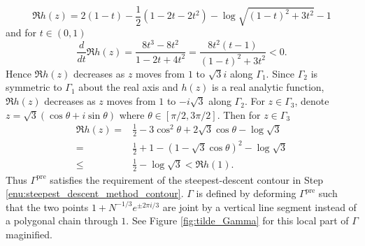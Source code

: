 \documentclass[11pt, a4paper]{article}
\numberwithin{equation}{section}
\DeclareMathOperator{\pre}{pre}
\theoremstyle{definition}
\theoremstyle{remark}
\begin{document}
\begin{equation}
  \Re h(z) = 2(1 - t) - \frac{1}{2}(1 - 2t - 2t^2) - \log \sqrt{(1 - t)^2 + 3t^2} - 1
\end{equation}
and for $t \in (0, 1)$
\begin{equation}
  \frac{d}{dt} \Re h(z) = \frac{8t^3 - 8t^2}{1 - 2t + 4t^2} = \frac{8t^2 (t - 1)}{(1 - t)^2 + 3t^2} < 0.
\end{equation}
Hence $\Re h(z)$ decreases as $z$ moves from $1$ to $\sqrt{3}i$ along $\Gamma_1$. Since $\Gamma_2$ is symmetric to $\Gamma_1$ about the real axis and $h(z)$ is a real analytic function, $\Re h(z)$ decreases as $z$ moves from $1$ to $-i\sqrt{3}$ along $\Gamma_2$. For $z \in \Gamma_3$, denote $z = \sqrt{3}(\cos\theta + i\sin\theta)$ where $\theta \in [\pi/2, 3\pi/2]$. Then for $z \in \Gamma_3$
\begin{equation}
  \begin{split}
    \Re h(z) = {}& \frac{1}{2} - 3\cos^2\theta + 2\sqrt{3}\cos\theta - \log \sqrt{3} \\
    = {}& \frac{1}{2} + 1 - (1 - \sqrt{3}\cos\theta)^2 - \log \sqrt{3} \\
    \leq {}& \frac{1}{2} - \log \sqrt{3} < \Re h(1).
  \end{split}
\end{equation}
Thus $\Gamma^{\pre}$ satisfies the requirement of the steepest-descent contour in Step \ref{enu:steepest_descent_method_contour}. $\Gamma$ is defined by deforming $\Gamma^{\pre}$ such that the two points $1 + N^{-1/3}e^{\pm 2\pi i/3}$ are joint by a vertical line segment instead of a polygonal chain through $1$. See Figure \ref{fig:tilde_Gamma} for this local part of $\Gamma$ maginified.
\end{document}
